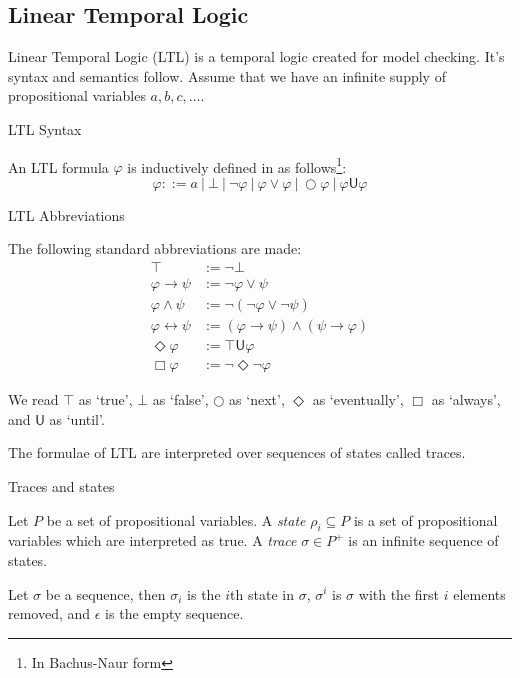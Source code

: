 \documentclass[a4paper]{article}
\newcommand{\U}{\mathsf{U}}
\begin{document}
\subsection{Linear Temporal Logic}
Linear Temporal Logic (LTL)\autocite{pnueli1977temporal} is a temporal logic created for model checking. It's syntax and semantics follow. Assume that we have an infinite supply of propositional variables $a,b,c,\dots$.
\begin{defn}{LTL Syntax}

  An LTL formula $\varphi$ is inductively defined in as follows\footnote{In Bachus-Naur form}:
  \[\varphi ::= a ~|~ \bot ~|~ \neg \varphi ~|~\varphi \lor \varphi ~|~ \bigcirc \varphi ~|~ \varphi \U\varphi\]
\end{defn}
\begin{notn}{LTL Abbreviations}

  The following standard abbreviations are made:
  \begin{align*}
    \top &:= \neg \bot\\
    \varphi \to \psi &:= \neg \varphi \lor \psi\\
    \varphi \land \psi &:= \neg (\neg \varphi \lor \neg \psi)\\
    \varphi \leftrightarrow \psi &:= (\varphi \to \psi) \land (\psi \to \varphi)\\
    \Diamond \varphi &:= \top \U{} \varphi\\
    \Box \varphi &:= \neg\Diamond\neg\varphi
  \end{align*}
\end{notn}

We read $\top$ as `true', $\bot$ as `false', $\bigcirc$ as `next', $\Diamond$ as `eventually', $\Box$ as `always', and $\U$ as `until'.

The formulae of LTL are interpreted over sequences of states called traces.

\begin{defn}{Traces and states}

  Let $P$ be a set of propositional variables. A \emph{state} $\rho_i \subseteq P$ is a set of propositional variables which are interpreted as true. A \emph{trace} $\sigma \in P^+$ is an infinite sequence of states.
\end{defn}

\begin{notn}
Let $\sigma$ be a sequence, then $\sigma_i$ is the $i$th state in $\sigma$, $\sigma^i$ is $\sigma$ with the first $i$ elements removed, and $\epsilon$ is the empty sequence.
\end{notn}
\end{document}
